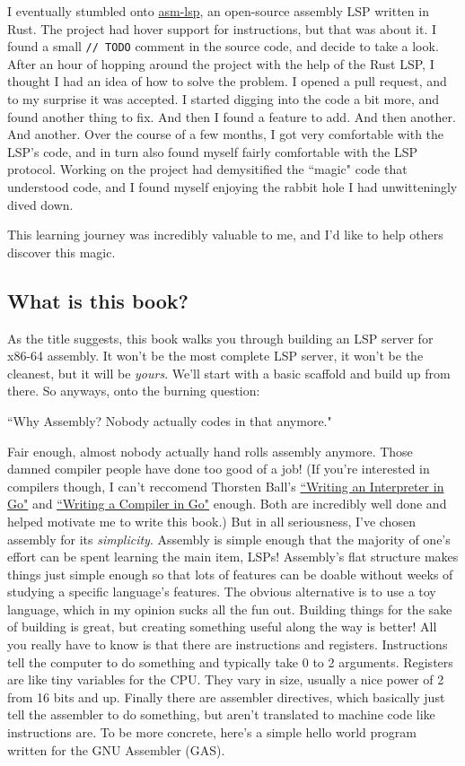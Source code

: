 I eventually stumbled onto \href{https://github.com/bergercookie/asm-lsp}{asm-lsp}, an open-source assembly LSP written in Rust. The project had hover support for instructions, but that was about it. I found a small \texttt{// TODO} comment in the source code, and decide to take a look. After an hour of hopping around the project with the help of the Rust LSP, I thought I had an idea of how to solve the problem. I opened a pull request, and to my surprise it was accepted. I started digging into the code a bit more, and found another thing to fix. And then I found a feature to add. And then another. And another. Over the course of a few months, I got very comfortable with the LSP's code, and in turn also found myself fairly comfortable with the LSP protocol. Working on the project had demysitified the ``magic" code that understood code, and I found myself enjoying the rabbit hole I had unwitteningly dived down.

This learning journey was incredibly valuable to me, and I'd like to help others  discover this magic. 

\subsection{What is this book?}

As the title suggests, this book walks you through building an LSP server for x86-64 assembly. It won't be the most complete LSP server, it won't be the cleanest, but it will be \textit{yours}. We'll start with a basic scaffold and build up from there. So anyways, onto the burning question:

``Why Assembly? Nobody actually codes in that anymore." 

Fair enough, almost nobody actually hand rolls assembly anymore. Those damned compiler people have done too good of a job! (If you're interested in compilers though, I  can't reccomend Thorsten Ball's \href{https://interpreterbook.com}{``Writing an  Interpreter in Go"} and \href{https://compilerbook.com}{``Writing a Compiler in  Go"} enough. Both are incredibly well done and helped motivate me to write this  book.) But in all seriousness, I've chosen assembly for its \textit{simplicity}. Assembly is simple enough that the majority of one's effort can be spent learning the main item, LSPs! Assembly's flat structure makes things just simple enough  so that lots of features can be doable without weeks of studying a specific language's features. The obvious alternative is to use a toy language, which in my opinion sucks all the fun out. Building things for the sake of building is great, but creating something useful along the way is better! All you really have to know is that there  are instructions and registers. Instructions tell the computer to do something and typically take 0 to 2 arguments. Registers are like tiny variables for the CPU. They vary in size, usually a nice power of 2 from 16 bits and up. Finally there are assembler directives, which basically just tell the assembler to do something, but aren't translated to machine code like instructions are. To be more concrete, here's a simple hello world program written for the GNU Assembler (GAS).

